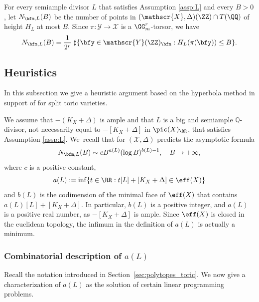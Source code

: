 For every semiample divisor $L$ that satisfies Assumption \ref{assp:L} and every $B>0$, let
$N_{\bfm, L}(B)$ be the number of points in $(\mathscr{X},\Delta)(\ZZ)\cap T(\QQ)$
of height $H_L$ at most $B$.
Since $\pi:\mathscr Y\to\mathscr X$ is a $\GG_m^r$-torsor, we have
\[
N_{\bfm,L}(B)=\frac 1{2^r}\ \sharp\{\bfy\in\mathscr{Y}(\ZZ)_{\bfm}: H_L(\pi(\bfy))\leq B\}.
\]

\subsection{Heuristics}
\label{sec:heuristics}
In this subsection we give a heuristic argument based on the hyperbola method
in support of \cite[Conj.\,1.1]{PSTVA} for split toric varieties.

We assume that $-(K_X+\Delta)$ is ample and that $L$ is a big and semiample $\mathbb Q$-divisor,
not necessarily equal to $-[K_X+\Delta]$ in $\pic(X)_{\RR}$, that satisfies Assumption \ref{assp:L}.
We~recall that \cite[Conj.\,1.1]{PSTVA} for $(\mathscr X,\Delta)$ predicts the asymptotic formula
\begin{equation}
\label{eq:conjecture}
N_{\bfm,L}(B)\sim c B^{a(L)}(\log B)^{b(L)-1}, \quad B\to+\infty,
\end{equation}
where $c$ is a positive constant,
\begin{equation}
a(L):=\inf\{t\in \RR: t[L]+[K_X+\Delta] \in \eff(X)\}
\end{equation}
and $b(L)$ is the codimension of the minimal face of $\eff(X)$ that contains
$a(L)[L]+[K_X+\Delta]$.
In particular, $b(L)$ is a positive integer, and $a(L)$ is a positive real number, as $-[K_X+\Delta]$ is ample. Since $\eff(X)$ is closed in the euclidean topology, the infimum in
the definition of $a(L)$ is actually a minimum.

\subsubsection{Combinatorial description of $a(L)$}
\label{sec:combinatorial_description_a}

Recall the notation introduced in Section~\ref{sec:polytopes_toric}.
We now give a characterization of $a(L)$ as the solution of certain linear programming problems.

